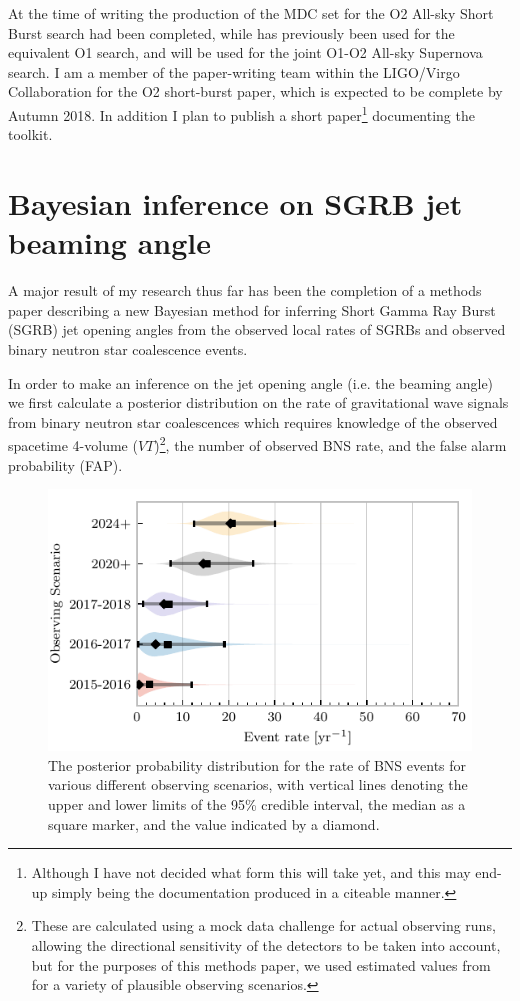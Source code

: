 \documentclass[openleft]{kentigern}
\theoremstyle{definition}
\begin{document}
At the time of writing the production of the MDC set for the O2
All-sky Short Burst search had been completed, while \minke{} has
previously been used for the equivalent O1 search, and will be used
for the joint O1-O2 All-sky Supernova search. I am a member of the
paper-writing team within the LIGO/Virgo Collaboration for the O2
short-burst paper, which is expected to be complete by Autumn 2018. In
addition I plan to publish a short paper\footnote{Although I have not
  decided what form this will take yet, and this may end-up simply
  being the documentation produced in a citeable manner.} documenting
the \minke{} toolkit.

\section{Bayesian inference on SGRB jet beaming angle}

A major result of my research thus far has been the completion of a
methods paper\cite{2017arXiv171202585W} describing a new Bayesian method for inferring Short
Gamma Ray Burst (SGRB) jet opening angles from the observed local
rates of SGRBs and observed binary neutron star coalescence events.



In order to make an inference on the jet opening angle (i.e. the
beaming angle) we first calculate a posterior distribution on the rate of
gravitational wave signals from binary neutron star coalescences which
requires knowledge of the observed spacetime 4-volume
($VT$)\footnote{These are calculated using a mock data challenge for
  actual observing runs, allowing the directional sensitivity of the
  detectors to be taken into account, but for the purposes of this
  methods paper, we used estimated values from
  \cite{observingscenarios} for a variety of plausible observing
  scenarios.}, the number of observed BNS rate, and the false alarm
probability (FAP).

\begin{figure}[b]
  \includegraphics{figures/sgrb/rate_posteriors_violin.pdf}
  \caption{The posterior probability distribution for the
    rate of BNS events for various different observing scenarios, with
    vertical lines denoting the upper and lower limits of the 95\%
    credible interval, the median as a square marker, and the
    \map{}value indicated by a diamond. \label{fig:rateposteriors}}
\end{figure}
\end{document}
